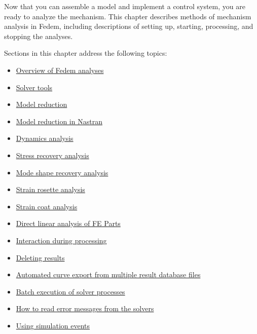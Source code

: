 %
%

%
%


Now that you can assemble a model and implement a control system,
you are ready to analyze the mechanism.
This chapter describes methods of mechanism analysis in Fedem, including
descriptions of setting up, starting, processing, and stopping the analyses.

Sections in this chapter address the following topics:

\begin{itemize}
\item
  \protect\hyperlink{overview-of-fedem-analyses}
                    {Overview of Fedem analyses}
\item
  \protect\hyperlink{solver-tools}
                    {Solver tools}
\item
  \protect\hyperlink{model-reduction}
                    {Model reduction}
\item
  \protect\hyperlink{model-reduction-in-nastran}
                    {Model reduction in Nastran}
\item
  \protect\hyperlink{dynamics-analysis}
                    {Dynamics analysis}
\item
  \protect\hyperlink{stress-recovery-analysis}
                    {Stress recovery analysis}
\item
  \protect\hyperlink{mode-shape-recovery-analysis}
                    {Mode shape recovery analysis}
\item
  \protect\hyperlink{strain-rosette-analysis-1}
                    {Strain rosette analysis}
\item
  \protect\hyperlink{strain-coat-analysis-1}
                    {Strain coat analysis}
\item
  \protect\hyperlink{direct-linear-analysis-of-fe-parts}
                    {Direct linear analysis of FE Parts}
\item
  \protect\hyperlink{interaction-during-processing}
                    {Interaction during processing}
\item
  \protect\hyperlink{deleting-results}
                    {Deleting results}
\item
  \protect\hyperlink{automated-curve-export-from-multiple-result-database-files}
                    {Automated curve export from multiple result database files}
\item
  \protect\hyperlink{batch-execution-of-solver-processes}
                    {Batch execution of solver processes}
\item
  \protect\hyperlink{how-to-read-error-messages-from-the-solvers}
                    {How to read error messages from the solvers}
\item
  \protect\hyperlink{using-simulation-events}
                    {Using simulation events}
\end{itemize}

